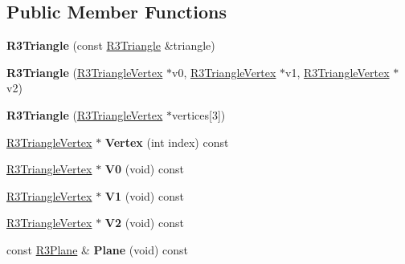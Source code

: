 \subsection*{Public Member Functions}
\begin{DoxyCompactItemize}
\item 
{\bfseries R3\+Triangle} (const \hyperlink{class_r3_triangle}{R3\+Triangle} \&triangle)\hypertarget{class_r3_triangle_aede76a868d13ee80e427900b31d3c283}{}\label{class_r3_triangle_aede76a868d13ee80e427900b31d3c283}

\item 
{\bfseries R3\+Triangle} (\hyperlink{class_r3_triangle_vertex}{R3\+Triangle\+Vertex} $\ast$v0, \hyperlink{class_r3_triangle_vertex}{R3\+Triangle\+Vertex} $\ast$v1, \hyperlink{class_r3_triangle_vertex}{R3\+Triangle\+Vertex} $\ast$v2)\hypertarget{class_r3_triangle_a5d8545a2e469ef81802ba91d98aec619}{}\label{class_r3_triangle_a5d8545a2e469ef81802ba91d98aec619}

\item 
{\bfseries R3\+Triangle} (\hyperlink{class_r3_triangle_vertex}{R3\+Triangle\+Vertex} $\ast$vertices\mbox{[}3\mbox{]})\hypertarget{class_r3_triangle_aa1658f56ed03b658990986bb3664a792}{}\label{class_r3_triangle_aa1658f56ed03b658990986bb3664a792}

\item 
\hyperlink{class_r3_triangle_vertex}{R3\+Triangle\+Vertex} $\ast$ {\bfseries Vertex} (int index) const \hypertarget{class_r3_triangle_af270909154d10a603b650fafbd806fc5}{}\label{class_r3_triangle_af270909154d10a603b650fafbd806fc5}

\item 
\hyperlink{class_r3_triangle_vertex}{R3\+Triangle\+Vertex} $\ast$ {\bfseries V0} (void) const \hypertarget{class_r3_triangle_ad3c47eeb4f1b893684da3484d3145027}{}\label{class_r3_triangle_ad3c47eeb4f1b893684da3484d3145027}

\item 
\hyperlink{class_r3_triangle_vertex}{R3\+Triangle\+Vertex} $\ast$ {\bfseries V1} (void) const \hypertarget{class_r3_triangle_ab4dba1ad4c077d08bed8d3f5e222db08}{}\label{class_r3_triangle_ab4dba1ad4c077d08bed8d3f5e222db08}

\item 
\hyperlink{class_r3_triangle_vertex}{R3\+Triangle\+Vertex} $\ast$ {\bfseries V2} (void) const \hypertarget{class_r3_triangle_aac0b228fc155088e2b48285945a9592d}{}\label{class_r3_triangle_aac0b228fc155088e2b48285945a9592d}

\item 
const \hyperlink{class_r3_plane}{R3\+Plane} \& {\bfseries Plane} (void) const \hypertarget{class_r3_triangle_ac7965ae02971b5378f086b0987ea8d4d}{}\label{class_r3_triangle_ac7965ae02971b5378f086b0987ea8d4d}


\end{DoxyCompactItemize}
